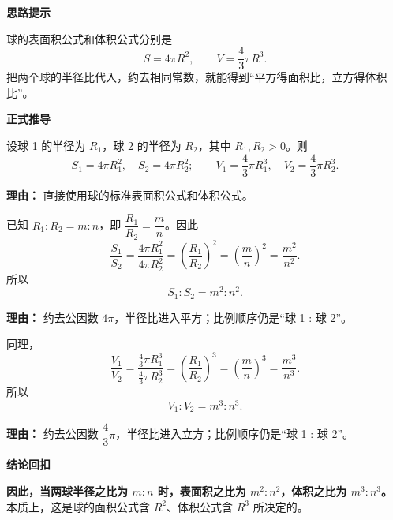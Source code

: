 \begin{proofbox}

\textbf{\textcolor{CProof}{思路提示}}

球的表面积公式和体积公式分别是
\[
S=4\pi R^2,
\qquad
V=\frac{4}{3}\pi R^3.
\]
把两个球的半径比代入，约去相同常数，就能得到“平方得面积比，立方得体积比”。

\medskip
\textbf{\textcolor{CProof}{正式推导}}
\begin{description}[style=nextline, leftmargin=2.8em, labelsep=0.5em, itemsep=0.55em]
    \item[\textbf{步骤一（列出公式）：}] 设球 1 的半径为 $R_1$，球 2 的半径为 $R_2$，其中 $R_1,R_2>0$。则
    \[
    S_1 = 4\pi R_1^2,
    \quad
    S_2 = 4\pi R_2^2;
    \qquad
    V_1 = \frac{4}{3}\pi R_1^3,
    \quad
    V_2 = \frac{4}{3}\pi R_2^3.
    \]
    \par\textbf{理由：} 直接使用球的标准表面积公式和体积公式。

    \item[\textbf{步骤二（推出表面积比）：}] 已知 $R_1:R_2=m:n$，即 $\dfrac{R_1}{R_2}=\dfrac{m}{n}$。因此
    \[
    \frac{S_1}{S_2}
    =\frac{4\pi R_1^2}{4\pi R_2^2}
    =\left(\frac{R_1}{R_2}\right)^2
    =\left(\frac{m}{n}\right)^2
    =\frac{m^2}{n^2}.
    \]
    所以
    \[
    S_1:S_2=m^2:n^2.
    \]
    \par\textbf{理由：} 约去公因数 $4\pi$，半径比进入平方；比例顺序仍是“球 1 : 球 2”。

    \item[\textbf{步骤三（推出体积比）：}] 同理，
    \[
    \frac{V_1}{V_2}
    =\frac{\frac{4}{3}\pi R_1^3}{\frac{4}{3}\pi R_2^3}
    =\left(\frac{R_1}{R_2}\right)^3
    =\left(\frac{m}{n}\right)^3
    =\frac{m^3}{n^3}.
    \]
    所以
    \[
    V_1:V_2=m^3:n^3.
    \]
    \par\textbf{理由：} 约去公因数 $\dfrac{4}{3}\pi$，半径比进入立方；比例顺序仍是“球 1 : 球 2”。
\end{description}

\medskip
\textbf{\textcolor{CProof}{结论回扣}}

\textbf{因此，当两球半径之比为 $m:n$ 时，表面积之比为 $m^2:n^2$，体积之比为 $m^3:n^3$。} 本质上，这是球的面积公式含 $R^2$、体积公式含 $R^3$ 所决定的。

\end{proofbox}
